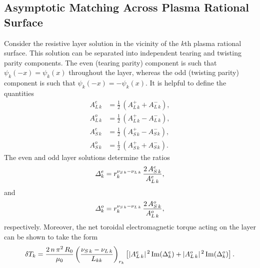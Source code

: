 \documentclass[12pt,prb,aps,notitlepage]{revtex4-1}
\begin{document}
\subsection{Asymptotic Matching Across Plasma Rational Surface}
Consider the resistive layer solution in the vicinity of the $k$th plasma rational surface. 
This solution can be separated into independent tearing and twisting parity components. 
The even (tearing parity)   component is such that $\psi_k(-x)=\psi_k(x)$ throughout the layer, whereas the  odd (twisting parity) component is such that
$\psi_k(-x)=-\psi_k(x)$. 
It is helpful to define the quantities
\begin{align}
A_{L\,k}^e &= \frac{1}{2}\,(A_{L\,k}^++A_{L\,k}^-),\\[0.5ex]
A_{L\,k}^o &= \frac{1}{2}\,(A_{L\,k}^+-A_{L\,k}^-),\\[0.5ex]
A_{S\,k}^e &= \frac{1}{2}\,(A_{S\,k}^+-A_{S\,k}^-),\\[0.5ex]
A_{S\,k}^o &= \frac{1}{2}\,(A_{S\,k}^++A_{S\,k}^-).
\end{align}
The even and odd  layer
solutions determine the ratios
\begin{equation}
{\mit\Delta}_k^e = r_k^{\nu_{S\,k}-\nu_{L\,k}}\,\frac{2\,A_{S\,k}^e}{A_{L\,k}^e},
\end{equation}
and
\begin{equation}
{\mit\Delta}_k^o = r_k^{\nu_{S\,k}-\nu_{L\,k}}\,\frac{2\,A_{S\,k}^o}{A_{L\,k}^o},
\end{equation}
respectively. Moreover, the net toroidal electromagnetic torque acting on the layer can be shown to take the form 
\begin{equation}
\delta T_k = \frac{2\,n\,\pi^2\,R_0}{\mu_0}\left(\frac{\nu_{S\,k}-\nu_{L\,k}}{L_{kk}}\right)_{r_k}\left[|A_{L\,k}^e|^{\,2}\,{\rm Im}(\Delta_k^e) + |A_{L\,k}^o|^{\,2}\,{\rm Im}(\Delta_k^o) \right].
\end{equation}
\end{document}
